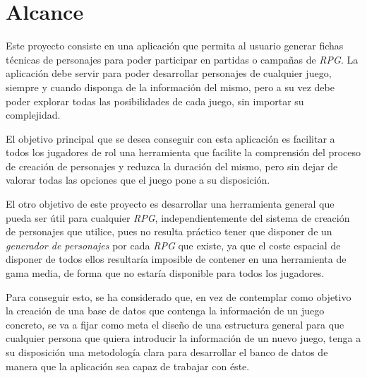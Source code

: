 
\section{Alcance} \label{Alcance}
Este proyecto consiste en una aplicación que permita al usuario generar fichas técnicas de personajes para 
poder participar en partidas o campañas de \textit{RPG}. La aplicación debe servir para poder desarrollar 
personajes de cualquier juego, siempre y cuando disponga de la información del mismo, pero a su vez debe 
poder explorar todas las posibilidades de cada juego, sin importar su complejidad. \medskip

El objetivo principal que se desea conseguir con esta aplicación es facilitar a todos los jugadores de rol una 
herramienta que facilite la comprensión del proceso de creación de personajes y reduzca la duración del mismo,
pero sin dejar de valorar todas las opciones que el juego pone a su disposición. \medskip

El otro objetivo de este proyecto es desarrollar una herramienta general que pueda ser útil para cualquier \textit{RPG},
independientemente del sistema de creación de personajes que utilice, pues no resulta práctico tener que disponer de 
un \textit{generador de personajes} por cada \textit{RPG} que existe, ya que el coste espacial de disponer de todos ellos 
resultaría imposible de contener en una herramienta de gama media, de forma que no estaría disponible para todos los jugadores.
\medskip

Para conseguir esto, se ha considerado que, en vez de contemplar como objetivo la creación de una base de datos que 
contenga la información de un juego concreto, se va a fijar como meta el diseño de una estructura general para que 
cualquier persona que quiera introducir la información de un nuevo juego, tenga a su disposición una metodología clara 
para desarrollar el banco de datos de manera que la aplicación sea capaz de trabajar con éste.
